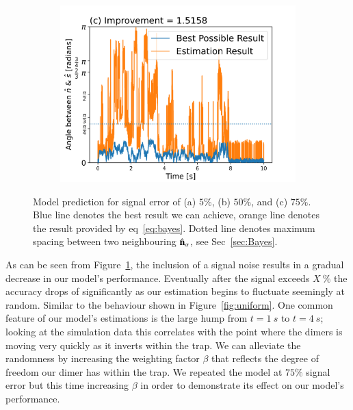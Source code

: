 \documentclass[final,  3p]{elsarticle}
\begin{document}
\begin{figure}[h]
\begin{subfigure}{0.32\textwidth}
		\includegraphics[width=\textwidth]{./Images/fig6c.png}
	\end{subfigure}
	\caption{Model prediction for signal error of (a) $5\%$, (b) $50\%$, and (c) $75\%$. Blue line denotes the best result we can achieve, orange line denotes the result provided by eq~\ref{eq:bayes}. Dotted line denotes maximum spacing between two neighbouring $\hat{\bf n}_\alpha$, see Sec~\ref{sec:Bayes}.}
	\label{fig:epsilon}
\end{figure}

As can be seen from Figure~\ref{fig:epsilon}, the inclusion of a signal noise results in a gradual decrease in our model's performance. Eventually after the signal exceeds $X \ \%$ the accuracy drops of significantly as our estimation begins to fluctuate seemingly at random. Similar to the behaviour shown in Figure~\ref{fig:uniform}. One common feature of our model's estimations is the large hump from $t = 1 \ s$ to $t = 4 \ s$; looking at the simulation data this correlates with the point where the dimers is moving very quickly as it inverts within the trap. We can alleviate the randomness by increasing the weighting factor $\beta$ that reflects the degree of freedom our dimer has within the trap. We repeated the model at $75\%$ signal error but this time increasing $\beta$ in order to demonstrate its effect on our model's performance. 
\end{document}

